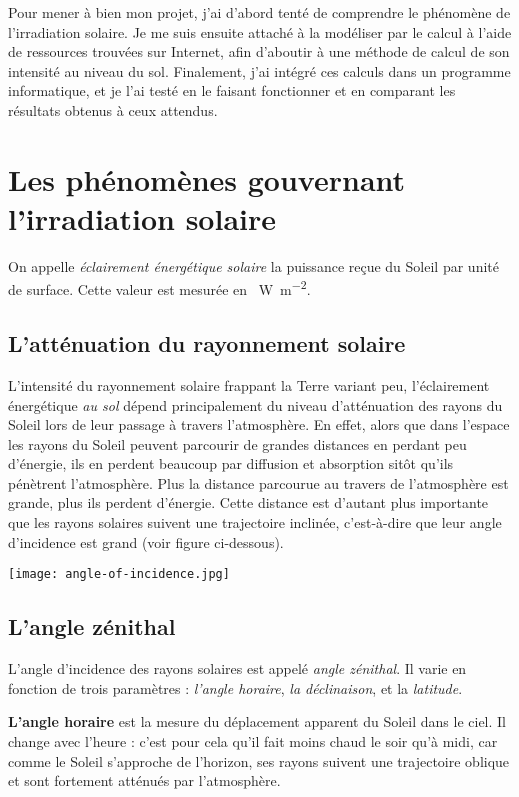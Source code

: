 \documentclass[12pt]{article}
\begin{document}
Pour mener à bien mon projet, j'ai d'abord tenté de comprendre le phénomène de l'irradiation solaire.
Je me suis ensuite attaché à la modéliser par le calcul à l'aide de ressources trouvées sur Internet, afin d'aboutir à une méthode de calcul de son intensité au niveau du sol.
Finalement, j'ai intégré ces calculs dans un programme informatique, et je l'ai testé en le faisant fonctionner et en comparant les résultats obtenus à ceux attendus.


\section{Les phénomènes gouvernant l'irradiation solaire}

On appelle \emph{éclairement énergétique solaire} la puissance reçue du Soleil par unité de surface.
Cette valeur est mesurée en \SI{}{\watt\per\square\meter}.

\subsection{L'atténuation du rayonnement solaire}
\label{sec:attenuation-rayonnement}
L'intensité du rayonnement solaire frappant la Terre variant peu, l'éclairement énergétique \emph{au sol} dépend principalement du niveau d'atténuation des rayons du Soleil lors de leur passage à travers l'atmosphère.
En effet, alors que dans l'espace les rayons du Soleil peuvent parcourir de grandes distances en perdant peu d'énergie, ils en perdent beaucoup par diffusion et absorption sitôt qu'ils pénètrent l'atmosphère.
Plus la distance parcourue au travers de l'atmosphère est grande, plus ils perdent d'énergie.
Cette distance est d'autant plus importante que les rayons solaires suivent une trajectoire inclinée, c'est-à-dire que leur angle d'incidence est grand (voir figure ci-dessous).

\centerline{\texttt{[image: angle-of-incidence.jpg]}}


\subsection{L'angle zénithal}
\label{sec:zenith-angle}
L'angle d'incidence des rayons solaires est appelé \emph{angle zénithal}.
Il varie en fonction de trois paramètres : \emph{l'angle horaire}, \emph{la déclinaison}, et la \emph{latitude}.

\textbf{L'angle horaire} est la mesure du déplacement apparent du Soleil dans le ciel. 
Il change avec l'heure : c'est pour cela qu'il fait moins chaud le soir qu'à midi, car comme le Soleil s'approche de l'horizon, ses rayons suivent une trajectoire oblique et sont fortement atténués par l'atmosphère.
\end{document}
